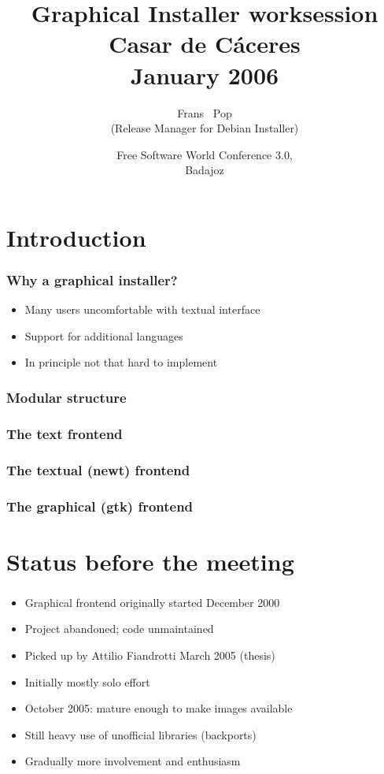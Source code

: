 \documentclass{beamer}
\title[Extremadura worksessions - Graphical Installer] %
{Graphical Installer worksession\\Casar de C\'{a}ceres\\January 2006}
\author[Frans Pop] %
{Frans ~Pop\\(Release Manager for Debian Installer)}
\date[February 2007] %
{Free Software World Conference 3.0,\\Badajoz}
\begin{document}
\begin{frame}
  \titlepage
\end{frame}

\begin{frame}
  \tableofcontents
\end{frame}


\section{Introduction}

\begin{frame}
  \frametitle{Why a graphical installer?}
	\begin{itemize}
	\item
		Many users uncomfortable with textual interface
	\item
		Support for additional languages
	\item
		In principle not that hard to implement
	\end{itemize}
\end{frame}

\begin{frame}
  \frametitle{Modular structure}
\end{frame}

\begin{frame}
  \frametitle{The text frontend}
\end{frame}

\begin{frame}
  \frametitle{The textual (newt) frontend}
\end{frame}

\begin{frame}
  \frametitle{The graphical (gtk) frontend}
\end{frame}

\section{Status before the meeting}

\begin{frame}
  \frametitle{}
	\begin{itemize}
	\item
		Graphical frontend originally started December 2000
	\item
		Project abandoned; code unmaintained
	\item
		Picked up by Attilio Fiandrotti March 2005 (thesis)
	\item
		Initially mostly solo effort
	\item
		October 2005: mature enough to make images available
	\item
		Still heavy use of unofficial libraries (backports)
	\item
		Gradually more involvement and enthusiasm
	\end{itemize}
\end{frame}
\end{document}
